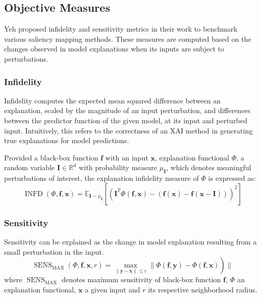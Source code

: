 \documentclass[../report.tex]{subfiles}
\begin{document}
    \subsection{Objective Measures}
    Yeh \etal \cite{yeh2019fidelity} proposed infidelity and sensitivity metrics in their work to benchmark various saliency mapping methods. These measures are computed based on the changes observed in model explanations when its inputs are subject to perturbations. 
    \subsubsection{Infidelity}
    Infidelity computes the expected mean squared difference between an explanation, scaled by the magnitude of an input perturbation, and differences between the predictor function of the given model, at its input and perturbed input. Intuitively, this refers to the correctness of an XAI method in generating true explanations for model predictions.
    
    Provided a black-box function $\mathbf{f}$ with an input $\mathbf{x}$, explanation functional $\Phi$, a random variable $\mathbf{I} \in \mathbb{R}^d$ with probability measure $\mu_{\mathbf{I}}$, which denotes meaningful perturbations of interest, the explanation infidelity measure of $\Phi$ is expressed as:
    \begin{equation}
    	\operatorname{INFD}(\Phi, \mathbf{f}, \mathbf{x})=\mathbb{E}_{\mathbf{I} \sim \mu_{\mathbf{I}}}\left[\left(\mathbf{I}^T \Phi(\mathbf{f}, \mathbf{x})-(\mathbf{f}(\mathbf{x})-\mathbf{f}(\mathbf{x}-\mathbf{I}))\right)^2\right]
    \end{equation}
    \subsubsection{Sensitivity}
    Sensitivity can be explained as the change in model explanation resulting from a small perturbation in the input.
      \begin{equation}
    	\left.\operatorname{SENS}_{\mathrm{MAX}}(\Phi, \mathbf{f}, \mathbf{x}, r)=\max _{\|\mathbf{y}-\mathbf{x}\| \leqslant r} \| \Phi(\mathbf{f}, \mathbf{y})-\Phi(\mathbf{f}, \mathbf{x})\right) \|
    \end{equation}
    where $\operatorname{SENS}_{\mathrm{MAX}}$ denotes maximum sensitivity of black-box function $\mathbf{f}$, $\Phi$ an explanation functional, $\mathbf{x}$ a given input and $r$ its respective neighborhood radius.
    
\end{document}
